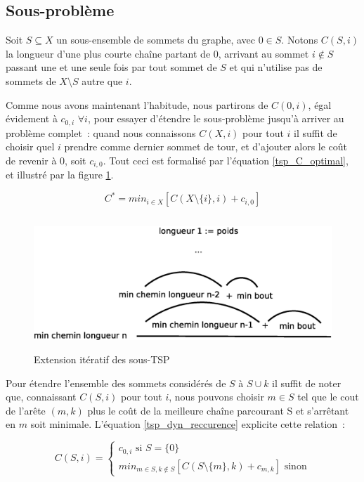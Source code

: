 \subsection{Sous-problème}

Soit $S \subseteq X$ un sous-ensemble de sommets du graphe, avec $0
\in S$. Notons $C(S,i)$ la longueur d'une plus courte chaîne partant
de $0$, arrivant au sommet $i \not\in S$ passant une et une seule fois
par tout sommet de $S$ et qui n'utilise pas de sommets de $X \setminus
S$ autre que $i$.

Comme nous avons maintenant l'habitude, nous partirons de $C({0}, i)$,
égal évidement à $c_{0,i}$ $\forall i$, pour essayer d'étendre le
sous-problème jusqu'à arriver au problème complet~: quand nous
connaissons $C(X,i)$ pour tout $i$ il suffit de choisir quel $i$
prendre comme dernier sommet de tour, et d'ajouter alors le coût de
revenir à $0$, soit $c_{i,0}$. Tout ceci est formalisé par l'équation
\ref{tsp_C_optimal}, et illustré par la figure
\ref{extension_tsp_chemins}.

\begin{equation}
\label{tsp_C_optimal}
C^* = min_{i \in X}[ C(X \setminus \{i\},i) + c_{i,0} ]
\end{equation}

\begin{figure}[!ht]
\begin{center}
\includegraphics[height=5cm]{../images/tspDyn.eps}
\end{center}
\caption{Extension itératif des sous-TSP}
\label{extension_tsp_chemins}
\end{figure}

Pour étendre l'ensemble des sommets considérés de $S$ à $S \cup {k}$
il suffit de noter que, connaissant $C(S,i)$ pour tout $i$, nous
pouvons choisir $m \in S$ tel que le cout de l'arête $(m,k)$ plus le
coût de la meilleure chaîne parcourant S et s'arrêtant en $m$ soit
minimale. L'équation \ref{tsp_dyn_reccurence} explicite cette
relation~:

\begin{equation}
\label{tsp_dyn_reccurence}
C(S, i) =
\begin{cases}
c_{0,i} \text{ si } S = \{0\} \\
min_{m \in S, k \not\in S}[ C(S\setminus\{m\}, k) + c_{m,k} ] \text{ sinon}
\end{cases}
\end{equation}

